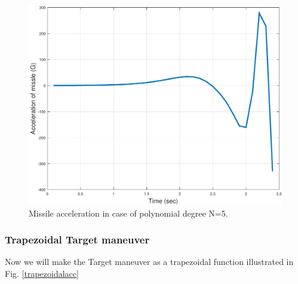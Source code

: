 \begin{figure}[htb]
	\centering
	\includegraphics[scale = 0.75]{fig/MissileAccelerationP5.pdf}
	\caption{Missile acceleration in case of polynomial degree N=5.}
	\label{missile accelerationP5}
\end{figure}


\subsubsection{Trapezoidal Target maneuver}
Now we will make the Target maneuver as a trapezoidal function illustrated in Fig. \ref{trapezoidalacc}


